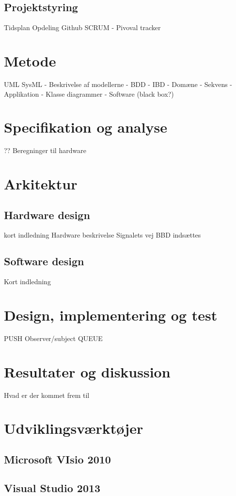 \subsection{Projektstyring}
Tidsplan
Opdeling
Github
SCRUM
- Pivoval tracker
\section{Metode}
UML
SysML
- Beskrivelse af modellerne
	- BDD
	- IBD
	- Domæne
	- Sekvens
	- Applikation
	- Klasse diagrammer
	- Software (black box?)
	
	
	
	\section{Specifikation og analyse}
	??
	Beregninger til hardware
	\section{Arkitektur}
	\subsection{Hardware design}
	kort indledning
	Hardware beskrivelse
	Signalets vej
	BBD indsættes
	\subsection{Software design}
	Kort indledning
	\section{Design, implementering og test}
	PUSH
	Observer/subject
	QUEUE
	
	
	
	
\section{Resultater og diskussion}
Hvad er der kommet frem til
\section{Udviklingsværktøjer}
\subsection{Microsoft VIsio 2010}
\subsection{Visual Studio 2013}
